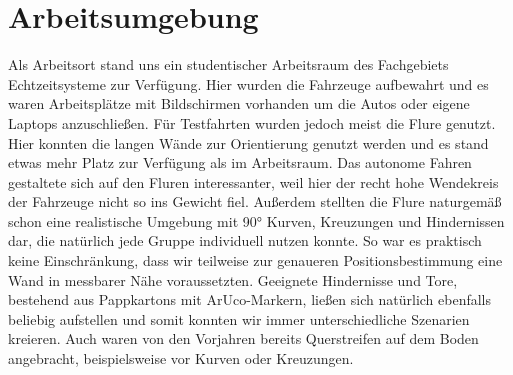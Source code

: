 \section{Arbeitsumgebung}
\label{sec:arbeitsumgebung}
Als Arbeitsort stand uns ein studentischer Arbeitsraum des Fachgebiets Echtzeitsysteme zur Verfügung. Hier wurden die Fahrzeuge aufbewahrt und es waren Arbeitsplätze mit Bildschirmen vorhanden um die Autos oder eigene Laptops anzuschließen. 
\newline
Für Testfahrten wurden jedoch meist die Flure genutzt. Hier konnten die langen Wände zur Orientierung genutzt werden und es stand etwas mehr Platz zur Verfügung als im Arbeitsraum. Das autonome Fahren gestaltete sich auf den Fluren interessanter, weil hier der recht hohe Wendekreis der Fahrzeuge nicht so ins Gewicht fiel. Außerdem stellten die Flure naturgemäß schon eine realistische Umgebung mit 90° Kurven, Kreuzungen und Hindernissen dar, die natürlich jede Gruppe individuell nutzen konnte. So war es praktisch keine Einschränkung, dass wir teilweise zur genaueren Positionsbestimmung eine Wand in messbarer Nähe voraussetzten. Geeignete Hindernisse und Tore, bestehend aus Pappkartons mit ArUco-Markern, ließen sich natürlich ebenfalls beliebig aufstellen und somit konnten wir immer unterschiedliche Szenarien kreieren. Auch waren von den Vorjahren bereits Querstreifen auf dem Boden angebracht, beispielsweise vor Kurven oder Kreuzungen.
